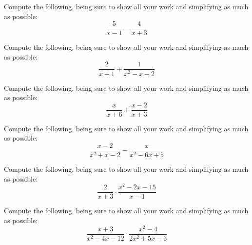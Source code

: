 \documentclass[11pt,letterpaper]{article}
\begin{document}

 Compute the following, being sure to show all your work and simplifying as much as possible:
	\[
	\dfrac{5}{x - 1} - \dfrac{4}{x + 3}
	\] \pspace





\newpage





 Compute the following, being sure to show all your work and simplifying as much as possible:
	\[
	\dfrac{2}{x + 1} + \dfrac{1}{x^2 - x - 2}
	\] \pspace





\newpage





 Compute the following, being sure to show all your work and simplifying as much as possible:
	\[
	\dfrac{x}{x + 6} + \dfrac{x - 2}{x + 3}
	\] \pspace





\newpage





 Compute the following, being sure to show all your work and simplifying as much as possible:
	\[
	\dfrac{x - 2}{x^2 + x - 2} - \dfrac{x}{x^2 - 6x + 5}
	\] \pspace





\newpage





 Compute the following, being sure to show all your work and simplifying as much as possible:
	\[
	\dfrac{2}{x + 3} \cdot \dfrac{x^2 - 2x - 15}{x - 1}
	\] \pspace





\newpage





 Compute the following, being sure to show all your work and simplifying as much as possible:
	\[
	\dfrac{x + 3}{x^2 - 4x - 12} \cdot \dfrac{x^2 - 4}{2x^2 + 5x - 3}
	\] \pspace
\end{document}
